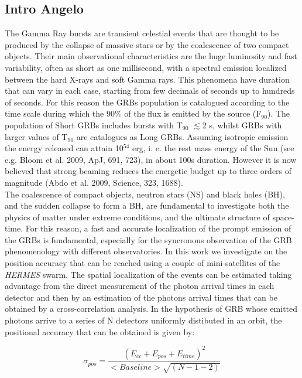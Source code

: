 \documentclass[]{spie}  %
\def \her{\textit{HERMES}\xspace}
\begin{document}
\subsection{Intro Angelo}
\label{sec:intro}  %


The Gamma Ray bursts are transient celestial events that are thought to be produced by the collapse of massive stars or by the coalescence of two compact objects. Their main observational characteristics are the huge luminosity and fast variability, often as short as one millisecond, with a spectral emission localized between the hard X-rays and soft Gamma rays. This phenomena have duration that can vary in each case, starting from few decimals of seconds up to hundreds of seconds. For this reason the GRBs population is catalogued according to the time scale during which the 90\% of the flux is emitted by the source (F$_{90}$). The population of Short GRBs includes bursts with T$_{90}$ $\lesssim$2 s, whilst GRBs with larger values of T$_{90}$ are catalogues as Long GRBs.
Assuming isotropic emission the energy released can attain 10$^{54}$ erg, i. e. the rest mass energy of the Sun (see e.g. Bloom et al. 2009, ApJ, 691, 723), in about 100s duration. However it is now believed that strong beaming reduces the energetic budget up to three orders of magnitude (Abdo et al. 2009, Science, 323, 1688).\\
The coalescence of compact objects, neutron stars (NS) and black holes (BH), and the sudden collapse to form a BH, are fundamental to investigate both the physics of matter under extreme conditions, and the ultimate structure of space-time. For this reason, a fast and accurate localization of the prompt emission of the GRBs is fundamental, especially for the syncronous observation of the GRB phenomenology with different observatories. 
In this work we investigate on the position accuracy that can be reached using a couple of mini-satellites of the \her{} swarm.
The spatial localization of the events can be estimated taking advantage from the direct measurement of the photon arrival times in each detector and then by an estimation of the photons arrival times that can be obtained by a cross-correlation analysis. 
In the hypothesis of GRB whose emitted photons arrive to a series of N detectors uniformly distibuted in an orbit, the positional accuracy that can be obtained is given by:

\begin{equation}
\label{eq:sigma_pos}
\sigma_{pos} = \dfrac{(E_{cc}+E_{pos}+E_{time})^2}{<Baseline>\sqrt{(N-1-2)}}
\end{equation}
\end{document}

